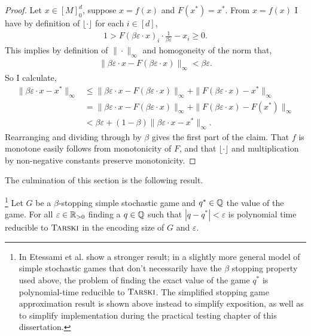 \newcommand{\bed}{\beta \varepsilon \cdot}
\begin{proof}
  Let $x \in [M]_0^d$, suppose $x = f(x)$ and $F(x^*) = x^*$.
  From $x = f(x)$ I have by definition of $\lfloor \cdot \rfloor$
  for each $i \in [d]$,
  \begin{align*}
  1 > 
    F(\beta \varepsilon \cdot x)_i \cdot \frac{1}{\beta \varepsilon} - x_i
  \geq 0.
  \end{align*}
  This implies by definition of $\|\cdot\|_\infty$ and homogoneity of the norm that,
  \begin{align*}
    \|\beta \varepsilon \cdot x - F(\beta \varepsilon \cdot x) \|_\infty < \beta \varepsilon.
  \end{align*}
  So I calculate,
  \begin{align*}
    \|\bed x - x^* \|_\infty &\leq 
     \| \bed x - F(\bed x)\|_\infty + \|F(\bed x) - x^* \|_\infty  \\
    &= \| \bed x - F(\bed x)\|_\infty + \|F(\bed x) - F(x^*) \|_\infty  \\
    &< \beta \varepsilon + (1 - \beta)\|\bed x - x^*\|_\infty.
  \end{align*}
  Rearranging and dividing through by $\beta$ gives the first part of the claim.
  That $f$ is monotone easily follows from monotonicity of $F$, and that $\lfloor \cdot \rfloor$ and
  multiplication by non-negative constants preserve monotonicity.
\end{proof}
The culmination of this section is the following result.
\begin{theorem}\footnote{
  In \citep{lowerBound} Etessami et al. show a stronger result; in a slightly more general
  model of simple stochastic games that don't necessarily have the $\beta$ stopping property used above,
  the problem of finding the exact value of the game $q^*$ is polynomial-time reducible to $\textsc{Tarski}$.
  The simplified stopping game approximation result is shown above instead to simplify exposition,
  as well as to simplify implementation during the practical testing chapter of this dissertation.
  }
  Let $G$ be a $\beta$-stopping simple stochastic game and $q^* \in \mathbb{Q}$ the value of the game.
  For all $\varepsilon \in \mathbb{R}_{> 0}$ finding a $q \in \mathbb{Q}$ such that $|q - q^*| < \varepsilon$
  is polynomial time reducible to $\textsc{Tarski}$ in the encoding size of $G$ and $\varepsilon$.
\end{theorem}

